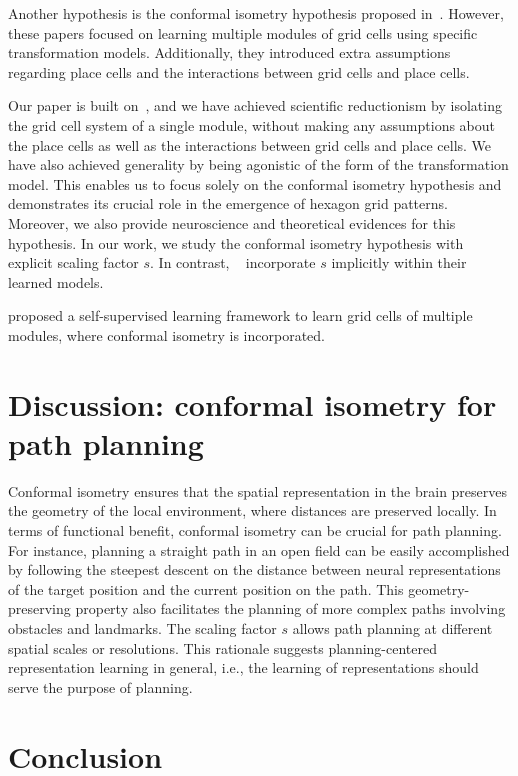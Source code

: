 \documentclass{article}
\begin{document}
Another hypothesis is the conformal isometry hypothesis proposed in~\citep{ gao2021,xu2022conformal}. However, these papers focused on learning multiple modules of grid cells using specific transformation models. Additionally, they introduced extra assumptions regarding place cells and the interactions between grid cells and place cells.

Our paper is built on~\citep{gao2021,xu2022conformal}, and we have achieved scientific reductionism by isolating the grid cell system of a single module, without making any assumptions about the place cells as well as the interactions between grid cells and place cells. We have also achieved generality by being agonistic of the form of the transformation model. This enables us to focus solely on the conformal isometry hypothesis and demonstrates its crucial role in the emergence of hexagon grid patterns. Moreover, we also provide neuroscience and theoretical evidences for this hypothesis. 
In our work, we study the conformal isometry hypothesis with explicit scaling factor $s$. In contrast, ~\citet{ gao2021,xu2022conformal} incorporate $s$ implicitly within their learned models. 

\cite{schaeffer2023self} proposed a self-supervised learning framework to learn grid cells of multiple modules, where conformal isometry is incorporated. 



\section{Discussion: conformal isometry for path planning}

Conformal isometry ensures that the spatial representation in the brain preserves the geometry of the local environment, where distances are preserved locally. In terms of functional benefit, conformal isometry can be crucial for path planning. For instance, planning a straight path in an open field can be easily accomplished by following the steepest descent on the distance between neural representations of the target position and the current position on the path. This geometry-preserving property also facilitates the planning of more complex paths involving obstacles and landmarks. The scaling factor $s$ allows path planning at different spatial scales or resolutions. This rationale suggests planning-centered representation learning in general, i.e., the learning of representations should serve the purpose of planning. 

\section{Conclusion} 
\end{document}
